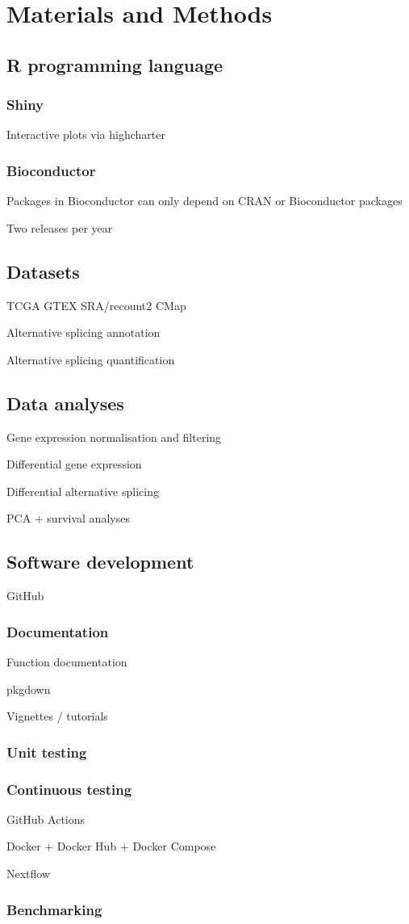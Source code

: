 \chapter{Materials and Methods}

\section{R programming language}

\subsection{Shiny}

Interactive plots via highcharter

\subsection{Bioconductor}

Packages in Bioconductor can only depend on CRAN or Bioconductor packages

Two releases per year

\section{Datasets}

TCGA
GTEX
SRA/recount2
CMap

Alternative splicing annotation

Alternative splicing quantification

\section{Data analyses}

Gene expression normalisation and filtering

Differential gene expression

Differential alternative splicing

PCA + survival analyses

\section{Software development}

GitHub

\subsection{Documentation}

Function documentation

pkgdown

Vignettes / tutorials

\subsection{Unit testing}

\subsection{Continuous testing}

GitHub Actions

Docker + Docker Hub + Docker Compose

Nextflow

\subsection{Benchmarking}
